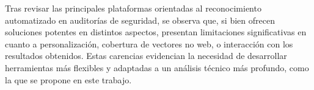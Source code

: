 \begin{parskipenv}
Tras revisar las principales plataformas orientadas al reconocimiento automatizado en auditorías de seguridad, se observa que, si bien ofrecen soluciones potentes en distintos aspectos, presentan limitaciones significativas en cuanto a personalización, cobertura de vectores no web, o interacción con los resultados obtenidos. Estas carencias evidencian la necesidad de desarrollar herramientas más flexibles y adaptadas a un análisis técnico más profundo, como la que se propone en este trabajo.

\end{parskipenv}
